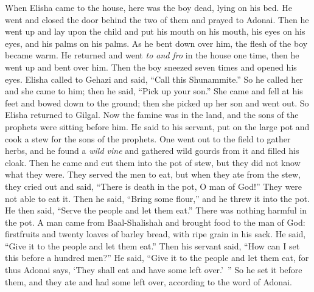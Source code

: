 \begin{biblechapter}
\verse When Elisha came to the house, here was the boy dead, lying on his bed.
\verse He went and closed the door behind the two of them and prayed to Adonai.
\verse Then he went up and lay upon the child and put his mouth on his mouth, his eyes on his eyes, and his palms on his palms. As he bent down over him, the flesh of the boy became warm.
\verse He returned and went \textit{to and fro} in the house one time, then he went up and bent over him. Then the boy sneezed seven times and opened his eyes.
\verse Elisha called to Gehazi and said, “Call this Shunammite.” So he called her and she came to him; then he said, “Pick up your son.”
\verse She came and fell at his feet and bowed down to the ground; then she picked up her son and went out.
 So Elisha returned to Gilgal. Now the famine was in the land, and the sons of the prophets were sitting before him. He said to his servant, put on the large pot and cook a stew for the sons of the prophets.
\verse One went out to the field to gather herbs, and he found a \textit{wild vine} and gathered wild gourds from it and filled his cloak. Then he came and cut them into the pot of stew, but they did not know what they were.
\verse They served the men to eat, but when they ate from the stew, they cried out and said, “There is death in the pot, O man of God!” They were not able to eat it.
\verse Then he said, “Bring some flour,” and he threw it into the pot. He then said, “Serve the people and let them eat.” There was nothing harmful in the pot.
\verse A man came from Baal-Shalishah and brought food to the man of God: firstfruits and twenty loaves of barley bread, with ripe grain in his sack. He said, “Give it to the people and let them eat.”
\verse Then his servant said, “How can I set this before a hundred men?” He said, “Give it to the people and let them eat, for thus Adonai says, ‘They shall eat and have some left over.’ ”
\verse So he set it before them, and they ate and had some left over, according to the word of Adonai.
\end{biblechapter}

